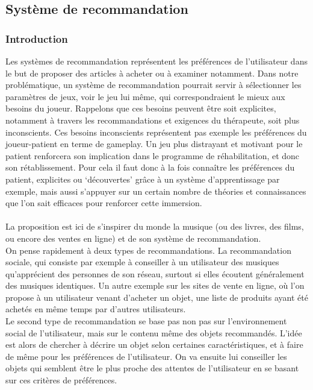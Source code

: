 \subsection{Système de recommandation }

		\subsubsection{Introduction}	
Les systèmes de recommandation représentent les préférences de l'utilisateur dans le but de proposer des articles à acheter ou à examiner notamment. Dans notre problématique, un système de recommandation pourrait servir à sélectionner les paramètres de jeux, voir le jeu lui même, qui correspondraient le mieux aux besoins du joueur. Rappelons que ces besoins peuvent être soit explicites, notamment à travers les recommandations et exigences du thérapeute, soit plus inconscients. Ces besoins inconscients représentent pas exemple les préférences du joueur-patient en terme de gameplay. Un jeu plus distrayant et motivant pour le patient renforcera son implication dans le programme de réhabilitation, et donc son rétablissement. Pour cela il faut donc à la fois connaître les préférences du patient, explicites ou `découvertes'  grâce à un système d'apprentissage par exemple, mais aussi s'appuyer sur un certain nombre de théories et connaissances que l'on sait efficaces pour renforcer cette immersion. 	
	 
 \paragraph{}
 La proposition est ici de s'inspirer du monde la musique (ou des livres, des films, ou encore des ventes en ligne) et de son système de recommandation.\\
 On pense rapidement à deux types de recommandations. La recommandation sociale, qui consiste par exemple à conseiller à un utilisateur des musiques qu'apprécient des personnes de son réseau, surtout si elles écoutent généralement des musiques identiques. Un autre exemple sur les sites de vente en ligne, où l'on propose à un utilisateur venant d'acheter un objet, une liste de produits ayant été achetés en même temps par d'autres utilisateurs. \\
Le second type de recommandation se base pas non pas sur l'environnement social de l'utilisateur, mais sur le contenu même des objets recommandés. L'idée est alors de chercher à décrire un objet selon certaines caractéristiques, et à faire de même pour les préférences de l'utilisateur. On va ensuite lui conseiller les objets qui semblent être le plus proche des attentes de l'utilisateur en se basant sur ces critères de préférences. 
 
